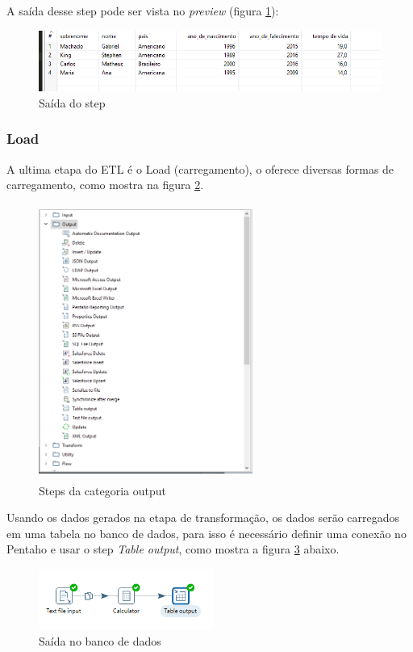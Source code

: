 A saída desse step pode ser vista no \textit{preview} (figura \ref{preview}):
\begin{figure}[H]
\centering
\includegraphics[height=2cm]{imagens/saidavida.png}
\caption{Saída do step}
\label{preview}
\end{figure}
\subsubsection{Load}
A ultima etapa do ETL é o Load (carregamento), o \pdi oferece diversas formas de carregamento, como mostra na figura \ref{outputsteps}.
\begin{figure}[H]
\centering
\includegraphics[width=7cm, height=9cm]{imagens/output.png}
\caption{Steps da categoria output}
\label{outputsteps}
\end{figure}
Usando os dados gerados na etapa de transformação, os dados serão carregados em uma tabela no banco de dados, para isso é necessário definir uma conexão no Pentaho e usar o step \textit{Table output}, como mostra a figura \ref{outputstep} abaixo.
\begin{figure}[H]
\centering
\includegraphics[height=2cm]{imagens/tableoutput.png}
\caption{Saída no banco de dados}
\label{outputstep}
\end{figure}
